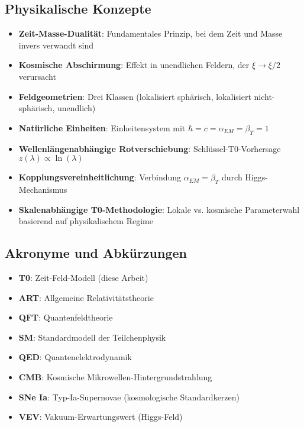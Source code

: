 \documentclass[12pt,a4paper]{article}
\begin{document}
	\subsection{Physikalische Konzepte}
	\label{app:physics_concepts}
	
	\begin{itemize}
		\item \textbf{Zeit-Masse-Dualität}: Fundamentales Prinzip, bei dem Zeit und Masse invers verwandt sind
		\item \textbf{Kosmische Abschirmung}: Effekt in unendlichen Feldern, der $\xi \to \xi/2$ verursacht
		\item \textbf{Feldgeometrien}: Drei Klassen (lokalisiert sphärisch, lokalisiert nicht-sphärisch, unendlich)
		\item \textbf{Natürliche Einheiten}: Einheitensystem mit $\hbar = c = \alpha_{EM} = \beta_T = 1$
		\item \textbf{Wellenlängenabhängige Rotverschiebung}: Schlüssel-T0-Vorhersage $z(\lambda) \propto \ln(\lambda)$
		\item \textbf{Kopplungsvereinheitlichung}: Verbindung $\alpha_{EM} = \beta_T$ durch Higgs-Mechanismus
		\item \textbf{Skalenabhängige T0-Methodologie}: Lokale vs. kosmische Parameterwahl basierend auf physikalischem Regime
	\end{itemize}
	
	\subsection{Akronyme und Abkürzungen}
	\label{app:abbreviations}
	
	\begin{itemize}
		\item \textbf{T0}: Zeit-Feld-Modell (diese Arbeit)
		\item \textbf{ART}: Allgemeine Relativitätstheorie \citep{einstein1915,misner1973}
		\item \textbf{QFT}: Quantenfeldtheorie \citep{weinberg1995,peskin1995}
		\item \textbf{SM}: Standardmodell der Teilchenphysik \citep{weinberg2003}
		\item \textbf{QED}: Quantenelektrodynamik \citep{feynman1985,peskin1995}
		\item \textbf{CMB}: Kosmische Mikrowellen-Hintergrundstrahlung \citep{planck2020}
		\item \textbf{SNe Ia}: Typ-Ia-Supernovae (kosmologische Standardkerzen)
		\item \textbf{VEV}: Vakuum-Erwartungswert (Higgs-Feld)
	\end{itemize}
	
\end{document}
